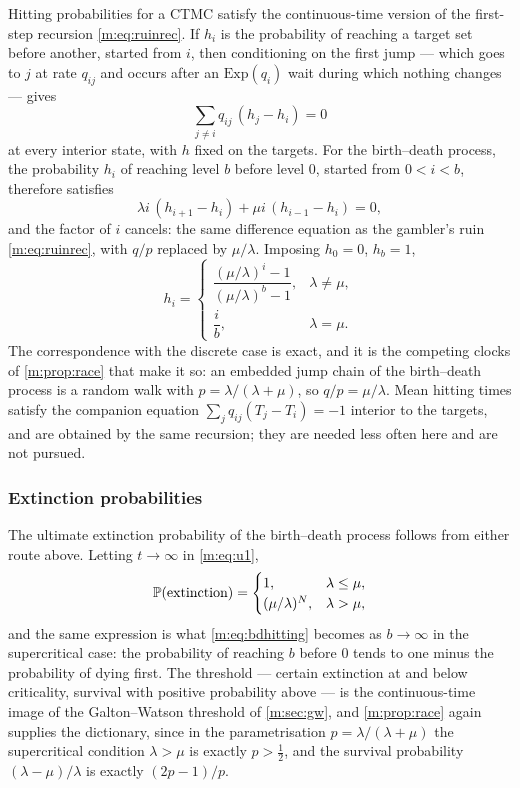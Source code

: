 Hitting probabilities for a CTMC satisfy the continuous-time version of the
first-step recursion \cref{m:eq:ruinrec}. If $h_i$ is the probability of
reaching a target set before another, started from $i$, then conditioning on
the first jump --- which goes to $j$ at rate $q_{ij}$ and occurs after an
$\mathrm{Exp}(q_i)$ wait during which nothing changes --- gives
\begin{equation}
\label{m:eq:hiteq}
\sum_{j\neq i}q_{ij}\,(h_j-h_i) = 0
\end{equation}
at every interior state, with $h$ fixed on the targets. For the birth--death
process, the probability $h_i$ of reaching level $b$ before level $0$, started
from $0<i<b$, therefore satisfies
\begin{equation*}
\lambda i\,(h_{i+1}-h_i) + \mu i\,(h_{i-1}-h_i) = 0 ,
\end{equation*}
and the factor of $i$ cancels: the same difference equation as the gambler's
ruin \cref{m:eq:ruinrec}, with $q/p$ replaced by $\mu/\lambda$. Imposing
$h_0=0$, $h_b=1$,
\begin{equation}
\label{m:eq:bdhitting}
h_i =
\begin{cases}
\dfrac{(\mu/\lambda)^{i}-1}{(\mu/\lambda)^{b}-1}, & \lambda\neq\mu,\\[8pt]
\dfrac{i}{b}, & \lambda=\mu .
\end{cases}
\end{equation}
The correspondence with the discrete case is exact, and it is the competing
clocks of \cref{m:prop:race} that make it so: an embedded jump chain of the
birth--death process is a random walk with $p=\lambda/(\lambda+\mu)$, so
$q/p=\mu/\lambda$. Mean hitting times satisfy the companion equation
$\sum_jq_{ij}(T_j-T_i)=-1$ interior to the targets, and are obtained by the
same recursion; they are needed less often here and are not pursued.

\subsubsection{Extinction probabilities}
\label{m:sec:extinctionct}

The ultimate extinction probability of the birth--death process follows from
either route above. Letting $t\to\infty$ in \cref{m:eq:u1},
\begin{equation}
\label{m:eq:bdextinction}
\mathbb{P}\!\left(\text{extinction}\right) =
\begin{cases}
1, & \lambda\le\mu,\\
(\mu/\lambda)^N, & \lambda>\mu,
\end{cases}
\end{equation}
and the same expression is what \cref{m:eq:bdhitting} becomes as $b\to\infty$
in the supercritical case: the probability of reaching $b$ before $0$ tends to
one minus the probability of dying first. The threshold --- certain extinction
at and below criticality, survival with positive probability above --- is the
continuous-time image of the Galton--Watson threshold of \cref{m:sec:gw}, and
\cref{m:prop:race} again supplies the dictionary, since in the parametrisation
$p=\lambda/(\lambda+\mu)$ the supercritical condition $\lambda>\mu$ is exactly
$p>\tfrac12$, and the survival probability $(\lambda-\mu)/\lambda$ is exactly
$(2p-1)/p$.

